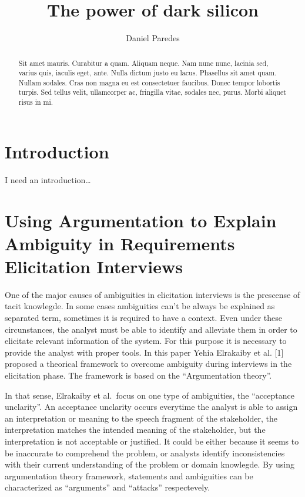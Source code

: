 \documentclass[]{llncs}
\institute{FH Dortmund, \\ \texttt{}}
\title{The power of dark silicon}
\author{Daniel Paredes}
\date{}
\begin{document}
\maketitle
\begin{abstract}
Sit amet mauris. Curabitur a quam. Aliquam neque. Nam nunc nunc, lacinia
sed, varius quis, iaculis eget, ante. Nulla dictum justo eu lacus.
Phasellus sit amet quam. Nullam sodales. Cras non magna eu est
consectetuer faucibus. Donec tempor lobortis turpis. Sed tellus velit,
ullamcorper ac, fringilla vitae, sodales nec, purus. Morbi aliquet risus
in mi.


\end{abstract}

\hypertarget{introduction}{%
\section{Introduction}\label{introduction}}

I need an introduction\ldots{}

\hypertarget{using-argumentation-to-explain-ambiguity-in-requirements-elicitation-interviews}{%
\section{Using Argumentation to Explain Ambiguity in Requirements
Elicitation
Interviews}\label{using-argumentation-to-explain-ambiguity-in-requirements-elicitation-interviews}}

One of the major causes of ambiguities in elicitation interviews is the
prescense of tacit knowlegde. In some cases ambiguities can't be always
be explained as separated term, sometimes it is required to have a
context. Even under these circunstances, the analyst must be able to
identify and alleviate them in order to elicitate relevant information
of the system. For this purpose it is necessary to provide the analyst
with proper tools. In this paper Yehia Elrakaiby et al. {[}1{]} proposed
a theorical framework to overcome ambiguity during interviews in the
elicitation phase. The framework is based on the ``Argumentation
theory''.

In that sense, Elrakaiby et al.~focus on one type of ambiguities, the
``acceptance unclarity''. An acceptance unclarity occurs everytime the
analyst is able to assign an interpretation or meaning to the speech
fragment of the stakeholder, the interpretation matches the intended
meaning of the stakeholder, but the interpretation is not acceptable or
justified. It could be either because it seems to be inaccurate to
comprehend the problem, or analysts identify inconsistencies with their
current understanding of the problem or domain knowlegde. By using
argumentation theory framework, statements and ambiguities can be
characterized as ``arguments'' and ``attacks'' respectevely.
\end{document}
